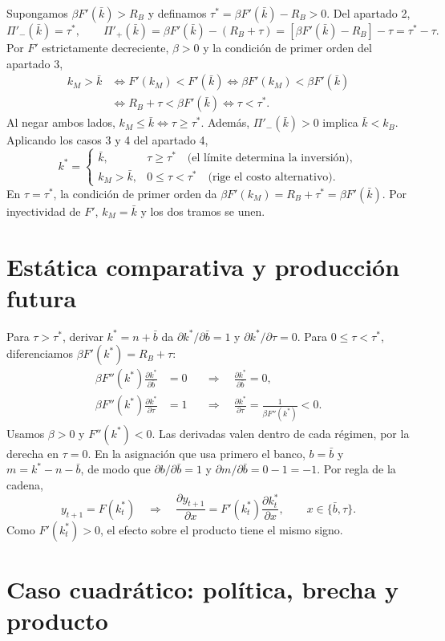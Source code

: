 \documentclass[11pt]{article}
\newcommand{\Rb}{R_B}
\newcommand{\kb}{k_B}
\newcommand{\km}{k_M}
\begin{document}
Supongamos $\beta F'(\bar k)>\Rb$ y definamos
$\tau^*=\beta F'(\bar k)-\Rb>0$. Del apartado 2,
\[
\Pi'_-(\bar k)=\tau^*,\qquad
\Pi'_+(\bar k)=\beta F'(\bar k)-(\Rb+\tau)
=[\beta F'(\bar k)-\Rb]-\tau=\tau^*-\tau.
\]
Por $F'$ estrictamente decreciente, $\beta>0$ y la condición de primer orden
del apartado 3,
\begin{align*}
\km>\bar k
&\iff F'(\km)<F'(\bar k)
\iff \beta F'(\km)<\beta F'(\bar k)\\
&\iff \Rb+\tau<\beta F'(\bar k)
\iff \tau<\tau^*.
\end{align*}
Al negar ambos lados, $\km\leq\bar k\iff\tau\geq\tau^*$.
Además, $\Pi'_-(\bar k)>0$ implica $\bar k<\kb$. Aplicando los casos 3 y 4
del apartado 4,
\[
k^*=\begin{cases}
\bar k, & \tau\geq\tau^*\quad\text{(el límite determina la inversión)},\\
\km>\bar k, & 0\leq\tau<\tau^*\quad\text{(rige el costo alternativo)}.
\end{cases}
\]
En $\tau=\tau^*$, la condición de primer orden da
$\beta F'(\km)=\Rb+\tau^*=\beta F'(\bar k)$. Por inyectividad de $F'$,
$\km=\bar k$ y los dos tramos se unen.

\section{Estática comparativa y producción futura}

Para $\tau>\tau^*$, derivar $k^*=n+\bar b$ da
$\partial k^*/\partial\bar b=1$ y $\partial k^*/\partial\tau=0$.
Para $0\leq\tau<\tau^*$, diferenciamos $\beta F'(k^*)=\Rb+\tau$:
\begin{align*}
\beta F''(k^*)\frac{\partial k^*}{\partial\bar b}&=0
&&\Rightarrow\quad\frac{\partial k^*}{\partial\bar b}=0,\\
\beta F''(k^*)\frac{\partial k^*}{\partial\tau}&=1
&&\Rightarrow\quad\frac{\partial k^*}{\partial\tau}
=\frac{1}{\beta F''(k^*)}<0.
\end{align*}
Usamos $\beta>0$ y $F''(k^*)<0$. Las derivadas valen dentro de cada
régimen, por la derecha en $\tau=0$. En la asignación que usa primero el
banco, $b=\bar b$ y $m=k^*-n-\bar b$, de modo que
$\partial b/\partial\bar b=1$ y $\partial m/\partial\bar b=0-1=-1$.
Por regla de la cadena,
\[
y_{t+1}=F(k_t^*)\quad\Rightarrow\quad
\frac{\partial y_{t+1}}{\partial x}
=F'(k_t^*)\frac{\partial k_t^*}{\partial x},
\qquad x\in\{\bar b,\tau\}.
\]
Como $F'(k_t^*)>0$, el efecto sobre el producto tiene el mismo signo.

\section{Caso cuadrático: política, brecha y producto}
\end{document}
